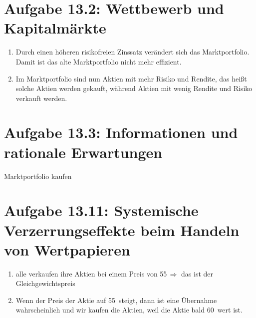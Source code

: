 \documentclass{article}
\begin{document}
	\section*{Aufgabe 13.2: Wettbewerb und Kapitalmärkte}
	\begin{enumerate}[label=(\alph*)]
		\item Durch einen höheren risikofreien Zinssatz verändert sich das Marktportfolio. Damit ist das alte Marktportfolio nicht mehr effizient.
		\begin{center}
		\end{center}
		\item Im Marktportfolio sind nun Aktien mit mehr Risiko und Rendite, das heißt solche Aktien werden gekauft, während Aktien mit wenig Rendite und Risiko verkauft werden.
	\end{enumerate}

	\section*{Aufgabe 13.3: Informationen und rationale Erwartungen}
	Marktportfolio kaufen

	\section*{Aufgabe 13.11: Systemische Verzerrungseffekte beim Handeln von Wertpapieren}
	\begin{enumerate}[label=(\alph*)]
		\item alle verkaufen ihre Aktien bei einem Preis von 55\EUR\,$\Rightarrow$ das ist der Gleichgewichtspreis
		\item Wenn der Preis der Aktie auf 55\EUR\, steigt, dann ist eine Übernahme wahrscheinlich und wir kaufen die Aktien, weil die Aktie bald 60\EUR\, wert ist.
	\end{enumerate}
\end{document}
